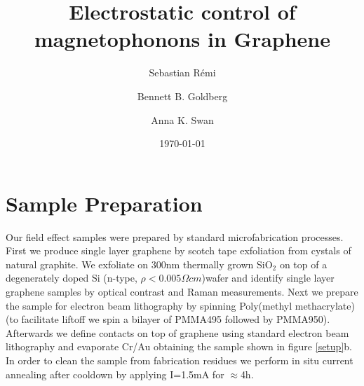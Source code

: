 \documentclass[prl,aps,superscriptaddress,preprint]{revtex4-1}
\begin{document}
\title{Electrostatic control of magnetophonons in Graphene} %

\author{Sebastian R\'{e}mi}

\author{Bennett B. Goldberg}


\author{Anna K. Swan}


\date{\today}



\pacs{}%

\maketitle %

\section{Sample Preparation}
Our field effect samples were prepared by standard microfabrication processes. First we produce single layer graphene by scotch tape exfoliation from cystals of natural graphite. We exfoliate on 300nm thermally grown SiO$_2$ on top of a degenerately doped Si (n-type, $\rho < 0.005 \Omega cm$)wafer \cite{novoselov2005two,novoselov2004electric} and identify single layer graphene samples by optical contrast and Raman measurements. Next we prepare the sample for electron beam lithography by spinning Poly(methyl methacrylate) (to facilitate liftoff we spin a bilayer of PMMA495 followed by PMMA950). Afterwards we define contacts on top of graphene using standard electron beam lithography and evaporate Cr/Au obtaining the sample shown in figure \ref{setup}b. In order to clean the sample from fabrication residues we perform in situ current annealing after cooldown by applying I=1.5mA for $\approx$4h.
\end{document}
